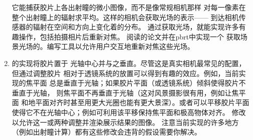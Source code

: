 \begin{enumerate}
      它能捕获胶片上各出射瞳的微小图像，而不是像常规相机那样
      对每一像素在整个出射瞳上的辐射求平均。这样的相机会获取光场的表示——
      到达相机传感器的辐射在空间和方向上变化着的分布。
      通过获取光场，就能实现许多有趣操作，包括拍摄相片后重新对焦。
      阅读\citeauthor{ng:hal-02551481}的论文并在pbrt中实现一个
      获取场景光场的。编写工具以允许用户交互地重新对焦这些光场。
      \item \circlethree {}的实现将胶片置于
      光轴中心并与之垂直。尽管这是真实相机最常见的配置，但通过调整胶片
      相对于透镜系统的放置可以得到有趣的效应。例如，当前实现的焦平面
      总是垂直于光轴；如果胶片平面（或透镜系统）倾斜使得胶片不垂直于光轴，
      则焦平面不再垂直于光轴（这对风景摄影很有用，例如让焦平面
      和地平面对齐时甚至用更大光圈也能有更大景深）。或者可以平移胶片平面
      使得它不在光轴中心；例如可利用该平移保持焦平面和极高物体对齐。
      修改以允许这一或两种调整并渲染展示结果的图像。
      注意当前实现的许多地方（例如出射瞳计算）都有这些修改会违背的假设需要你解决。
\end{enumerate}